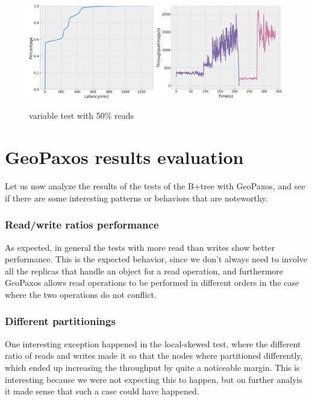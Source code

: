 \begin{figure}[!htb]
  \centering
  \includegraphics[width=0.49\textwidth,height=\textheight,keepaspectratio]{img/variable50_lat.png}
  \includegraphics[width=0.49\textwidth,height=\textheight,keepaspectratio]{img/variable50_tp.png}
  \caption{ variable test with 50\% reads }
  \label{fig:variable50-performance}
\end{figure}

\section{GeoPaxos results evaluation}\label{sec:geopaxos-results-evaluation}
Let us now analyze the results of the tests of the B+tree with GeoPaxos, and see if there are some interesting patterns or behaviors that are noteworthy.

\subsubsection{Read/write ratios performance}
As expected, in general the tests with more read than writes show better performance. This is the expected behavior, since we don't always need to involve all the replicas that handle an object for a read operation, and furthermore GeoPaxos allows read operations to be performed in different orders in the case where the two operations do not conflict.

\subsubsection{Different partitionings}
One interesting exception happened in the local-skewed test, where the different ratio of reads and writes made it so that the nodes where partitioned differently, which ended up increasing the throughput by quite a noticeable margin. This is interesting because we were not expecting this to happen, but on further analyis it made sense that such a case could have happened.

